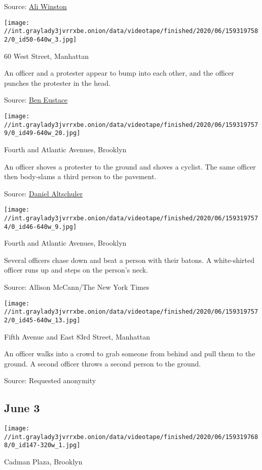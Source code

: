 Source:
\href{https://twitter.com/awinston/status/1267975128324898818}{Ali
Winston}

\texttt{[image: //int.graylady3jvrrxbe.onion/data/videotape/finished/2020/06/1593197582/0\_id50-640w\_3.jpg]}

 60 West Street, Manhattan

 An officer and a protester appear to bump into each other, and the
officer punches the protester in the head.

Source:
\href{https://twitter.com/beustmode/status/1268190262355988481}{Ben
Eustace}

\texttt{[image: //int.graylady3jvrrxbe.onion/data/videotape/finished/2020/06/1593197579/0\_id49-640w\_20.jpg]}

 Fourth and Atlantic Avenues, Brooklyn

 An officer shoves a protester to the ground and shoves a cyclist. The
same officer then body-slams a third person to the pavement.

Source:
\href{https://twitter.com/altochulo/status/1268008988211400704}{Daniel
Altschuler}

\texttt{[image: //int.graylady3jvrrxbe.onion/data/videotape/finished/2020/06/1593197574/0\_id46-640w\_9.jpg]}

 Fourth and Atlantic Avenues, Brooklyn

 Several officers chase down and beat a person with their batons. A
white-shirted officer runs up and steps on the person's neck.

Source: Allison McCann/The New York Times

\texttt{[image: //int.graylady3jvrrxbe.onion/data/videotape/finished/2020/06/1593197572/0\_id45-640w\_13.jpg]}

 Fifth Avenue and East 83rd Street, Manhattan

 An officer walks into a crowd to grab someone from behind and pull them
to the ground. A second officer throws a second person to the ground.

Source: Requested anonymity

\hypertarget{june-3}{%
\subsection{June 3}\label{june-3}}

\texttt{[image: //int.graylady3jvrrxbe.onion/data/videotape/finished/2020/06/1593197688/0\_id147-320w\_1.jpg]}

 Cadman Plaza, Brooklyn

